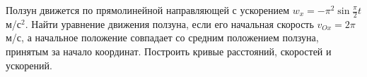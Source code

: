Ползун движется по прямолинейной направляющей с ускорением
$w_x=-\pi^2 \sin \frac{\pi}{2} t$ м/с$^2$. Найти уравнение движения
ползуна, если его начальная скорость $v_{Ox}=2\pi$ м/с, а начальное
положение совпадает со средним положением ползуна, принятым за начало
координат. Построить кривые расстояний, скоростей и ускорений.
